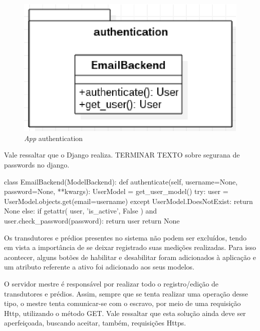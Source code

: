 \begin{figure}[!h]
    \centering
    \includegraphics[keepaspectratio=true,scale=0.8]{figuras/authentication.eps}
    \caption{\textit{App} authentication}
    \label{authentication}
\end{figure}

Vale ressaltar que o Django realiza. TERMINAR TEXTO sobre segurana de passwords no django.

\begin{python}[caption={Corpo do método authenticate, classe EmailBackend.}, captionpos=b]
class EmailBackend(ModelBackend):
    def authenticate(self, username=None, password=None, **kwargs):
        UserModel = get_user_model()
        try:
            user = UserModel.objects.get(email=username)
        except UserModel.DoesNotExist:
            return None
        else:
            if getattr(
                user, 'is_active', False
            ) and user.check_password(password):
                return user
        return None
\end{python}

Os transdutores e prédios presentes no sistema não podem ser excluídos, tendo em vista a importância de se deixar registrado suas medições realizadas. Para isso acontecer, alguns botões de habilitar e desabilitar foram adicionados à aplicação e um atributo referente a ativo foi adicionado aos seus modelos.

O servidor mestre é responsável por realizar todo o registro/edição de transdutores e prédios. Assim, sempre que se tenta realizar uma operação desse tipo, o mestre tenta comunicar-se com o escravo, por meio de uma requisição Http, utilizando o método GET. Vale ressaltar que esta solução ainda deve ser aperfeiçoada, buscando aceitar, também, requisições Https.

